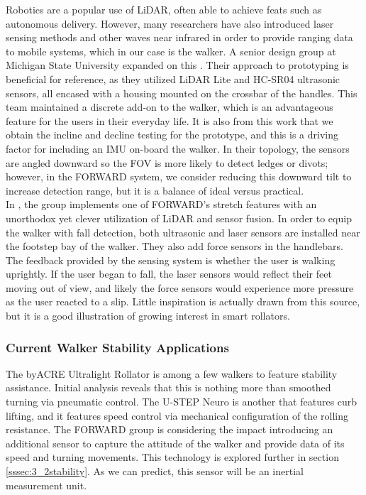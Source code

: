 \noindent Robotics are a popular use of LiDAR, often able to achieve feats such as autonomous delivery. However, many researchers have also introduced laser sensing methods and other waves near infrared in order to provide ranging data to mobile systems, which in our case is the walker. A senior design group at Michigan State University expanded on this \cite{mstate}. Their approach to prototyping is beneficial for reference, as they utilized LiDAR Lite and HC-SR04 ultrasonic sensors, all encased with a housing mounted on the crossbar of the handles. This team maintained a discrete add-on to the walker, which is an advantageous feature for the users in their everyday life. It is also from this work that we obtain the incline and decline testing for the prototype, and this is a driving factor for including an IMU on-board the walker. In their topology, the sensors are angled downward so the FOV is more likely to detect ledges or divots; however, in the FORWARD system, we consider reducing this downward tilt to increase detection range, but it is a balance of ideal versus practical.\\

\noindent In \cite{FallDetect}, the group implements one of FORWARD's stretch features with an unorthodox yet clever utilization of LiDAR and sensor fusion. In order to equip the walker with fall detection, both ultrasonic and laser sensors are installed near the footstep bay of the walker. They also add force sensors in the handlebars. The feedback provided by the sensing system is whether the user is walking uprightly. If the user began to fall, the laser sensors would reflect their feet moving out of view, and likely the force sensors would experience more pressure as the user reacted to a slip. Little inspiration is actually drawn from this source, but it is a good illustration of growing interest in smart rollators.\\

\subsubsection{Current Walker Stability Applications}
\noindent The byACRE Ultralight Rollator \cite{byACRE} is among a few walkers to feature stability assistance. Initial analysis reveals that this is nothing more than smoothed turning via pneumatic control. The U-STEP Neuro \cite{ustep} is another that features curb lifting, and it features speed control via mechanical configuration of the rolling resistance. The FORWARD group is considering the impact introducing an additional sensor to capture the attitude of the walker and provide data of its speed and turning movements. This technology is explored further in section \ref{sssec:3_2stability}. As we can predict, this sensor will be an inertial measurement unit.\\


